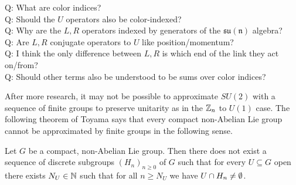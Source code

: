 \documentclass[10pt,reqno]{amsart}
\begin{document}
	\noindent Q: What are color indices?\\
	Q: Should the $U$ operators also be color-indexed?\\
	Q: Why are the $L,R$ operators indexed by generators of the $\mathfrak{su(n)}$ algebra?\\
	Q: Are $L,R$ conjugate operators to $U$ like position/momentum?\\
	Q: I think the only difference between $L,R$ is which end of the link they act on/from?\\
	Q: Should other terms also be understood to be sums over color indices? 
	
	After more research, it may not be possible to approximate $SU(2)$ with a sequence of finite groups to preserve unitarity as in the $\mathbb{Z}_n$ to $U(1)$ case. 
	The following theorem of Toyama says that every compact non-Abelian Lie group cannot be approximated by finite groups in the following sense.
	\begin{theorem}
		Let $G$ be a compact, non-Abelian Lie group. Then there does not exist a sequence of discrete subgroups $(H_n)_{n\geq 0}$ of $G$ such that for every $U \subseteq G$ open there exists $N_U \in \mathbb{N}$ such that for all $n \geq N_U$ we have $U \cap H_n \neq \emptyset$.
	\end{theorem}
	
	
	
	\nocite{Hamer82}
	\nocite{AKHvD11}
	\nocite{vDBC78}
\end{document}
